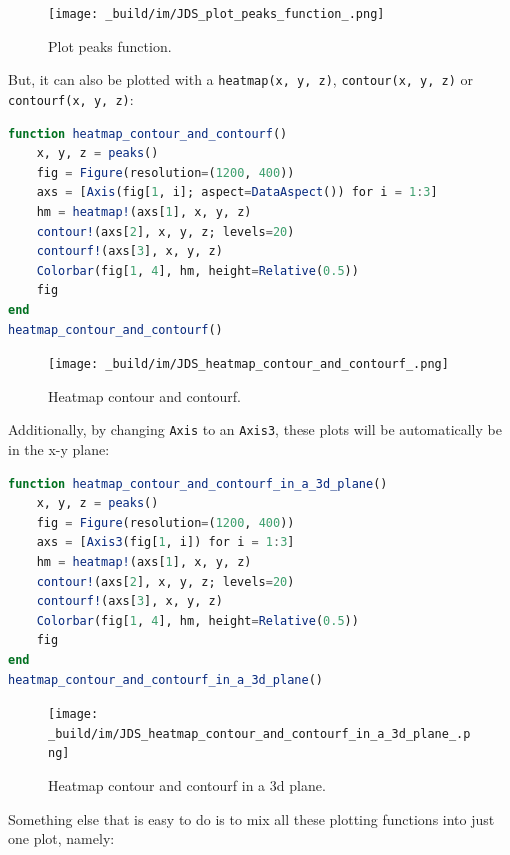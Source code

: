 \documentclass[
  notoc %
]{tufte-book}
\newcommand{\passthrough}[1]{#1}
\begin{document}
\begin{figure}
\hypertarget{fig:plot_peaks_function}{%
\centering
\texttt{[image: \_build/im/JDS\_plot\_peaks\_function\_.png]}
\caption{Plot peaks function.}\label{fig:plot_peaks_function}
}
\end{figure}

But, it can also be plotted with a
\passthrough{\lstinline!heatmap(x, y, z)!},
\passthrough{\lstinline!contour(x, y, z)!} or
\passthrough{\lstinline!contourf(x, y, z)!}:

\begin{lstlisting}[language=Julia]
function heatmap_contour_and_contourf()
    x, y, z = peaks()
    fig = Figure(resolution=(1200, 400))
    axs = [Axis(fig[1, i]; aspect=DataAspect()) for i = 1:3]
    hm = heatmap!(axs[1], x, y, z)
    contour!(axs[2], x, y, z; levels=20)
    contourf!(axs[3], x, y, z)
    Colorbar(fig[1, 4], hm, height=Relative(0.5))
    fig
end
heatmap_contour_and_contourf()
\end{lstlisting}

\begin{figure}
\hypertarget{fig:heatmap_contour_and_contourf}{%
\centering
\texttt{[image: \_build/im/JDS\_heatmap\_contour\_and\_contourf\_.png]}
\caption{Heatmap contour and
contourf.}\label{fig:heatmap_contour_and_contourf}
}
\end{figure}

Additionally, by changing \passthrough{\lstinline!Axis!} to an
\passthrough{\lstinline!Axis3!}, these plots will be automatically be in
the x-y plane:

\begin{lstlisting}[language=Julia]
function heatmap_contour_and_contourf_in_a_3d_plane()
    x, y, z = peaks()
    fig = Figure(resolution=(1200, 400))
    axs = [Axis3(fig[1, i]) for i = 1:3]
    hm = heatmap!(axs[1], x, y, z)
    contour!(axs[2], x, y, z; levels=20)
    contourf!(axs[3], x, y, z)
    Colorbar(fig[1, 4], hm, height=Relative(0.5))
    fig
end
heatmap_contour_and_contourf_in_a_3d_plane()
\end{lstlisting}

\begin{figure}
\hypertarget{fig:heatmap_contour_and_contourf_in_a_3d_plane}{%
\centering
\texttt{[image: \_build/im/JDS\_heatmap\_contour\_and\_contourf\_in\_a\_3d\_plane\_.png]}
\caption{Heatmap contour and contourf in a 3d
plane.}\label{fig:heatmap_contour_and_contourf_in_a_3d_plane}
}
\end{figure}

Something else that is easy to do is to mix all these plotting functions
into just one plot, namely:
\end{document}
